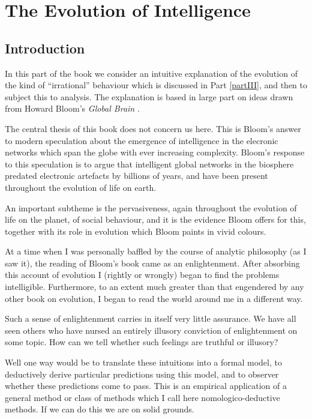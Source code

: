 
\part{The Evolution of Intelligence}\label{partI}


\chapter{Introduction}

In this part of the book we consider an intuitive explanation of the evolution of the kind of ``irrational'' behaviour which is discussed in Part \ref{partIII}, and then to subject this to analysis.
The explanation is based in large part on ideas drawn from Howard Bloom's \emph{Global Brain} \cite{bloomBRAIN}.

The central thesis of this book does not concern us here.
This is Bloom's answer to modern speculation about the emergence of intelligence in the elecronic networks which span the globe with ever increasing complexity.
Bloom's response to this speculation is to argue that intelligent global networks in the biosphere predated electronic artefacts by billions of years, and have been present throughout the evolution of life on earth.

An important subtheme is the pervasiveness, again throughout the evolution of life on the planet, of social behaviour, and it is the evidence Bloom offers for this, together with its role in evolution which Bloom paints in vivid colours.

At a time when I was personally baffled by the course of analytic philosophy (as I saw it), the reading of Bloom's book came as an enlightenment.
After absorbing this account of evolution I (rightly or wrongly) began to find the problems intelligible.
Furthermore, to an extent much greater than that engendered by any other book on evolution, I began to read the world around me in a different way.

Such a sense of enlightenment carries in itself very little assurance.
We have all seen others who have nursed an entirely illusory conviction of enlightenment on some topic.
How can we tell whether such feelings are truthful or illusory?

Well one way would be to translate these intuitions into a formal model, to deductively derive particular predictions using this model, and to observer whether these predictions come to pass.
This is an empirical application of a general method or class of methods which I call here nomologico-deductive methods.
If we can do this we are on solid grounds.

